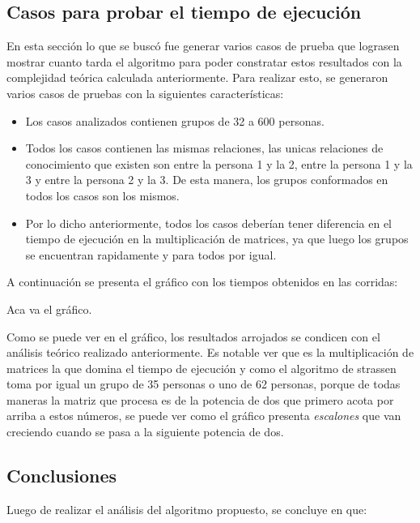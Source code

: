 \documentclass[a4paper, 12pt]{article}
\begin{document}
\subsection*{Casos para probar el tiempo de ejecuci\'on}

En esta secci\'on lo que se busc\'o fue generar varios casos de prueba que lograsen mostrar cuanto tarda el algoritmo para poder constratar estos resultados con la complejidad te\'orica calculada anteriormente. Para realizar esto, se generaron varios casos de pruebas con la siguientes caracter\'isticas:

\begin{itemize}
\item Los casos analizados contienen grupos de 32 a 600 personas.
\item Todos los casos contienen las mismas relaciones, las unicas relaciones de conocimiento que existen son entre la persona 1 y la 2, entre la persona 1 y la 3 y entre la persona 2 y la 3. De esta manera, los grupos conformados en todos los casos son los mismos.
\item Por lo dicho anteriormente, todos los casos deber\'ian tener diferencia en el tiempo de ejecuci\'on en la multiplicaci\'on de matrices, ya que luego los grupos se encuentran rapidamente y para todos por igual.
\end{itemize}
A continuaci\'on se presenta el gr\'afico con los tiempos obtenidos en las corridas:

Aca va el gr\'afico.


Como se puede ver en el gr\'afico, los resultados arrojados se condicen con el an\'alisis te\'orico realizado anteriormente. Es notable ver que es la multiplicaci\'on de matrices la que domina el tiempo de ejecuci\'on y como el algoritmo de strassen toma por igual un grupo de 35 personas o uno de 62 personas, porque de todas maneras la matriz que procesa es de la potencia de dos que primero acota por arriba a estos n\'umeros, se puede ver como el gr\'afico presenta \emph{escalones} que van creciendo cuando se pasa a la siguiente potencia de dos.


\subsection*{Conclusiones}
Luego de realizar el an\'alisis del algoritmo propuesto, se concluye en que:
\end{document}
